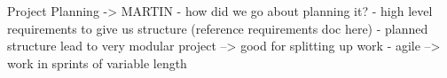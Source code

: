 Project Planning -> MARTIN
  - how did we go about planning it?
  - high level requirements to give us structure (reference requirements doc here)
  - planned structure lead to very modular project --> good for splitting up work
  - agile --> work in sprints of variable length
